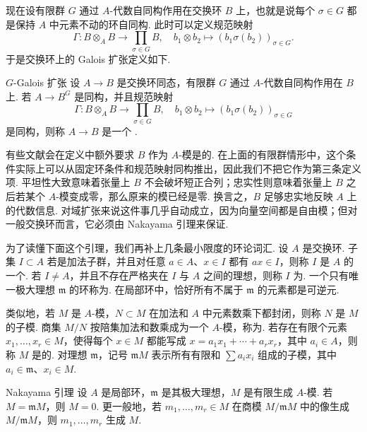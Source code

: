 现在设有限群 $G$ 通过 $A$-代数自同构作用在交换环 $B$ 上，也就是说每个 $\sigma\in G$ 都是保持 $A$ 中元素不动的环自同构. 此时可以定义规范映射
\[
    \Gamma\colon B\otimes_A B\to \prod_{\sigma\in G}B,\quad
    b_1\otimes b_2\mapsto \left(b_1\sigma(b_2)\right)_{\sigma\in G}.
\]
于是交换环上的 Galois 扩张定义如下.

\begin{definition}{$G$-Galois 扩张}{}
    设 $A\to B$ 是交换环同态，有限群 $G$ 通过 $A$-代数自同构作用在 $B$ 上. 若 $A\to B^G$ 是同构，并且规范映射
    \[
        \Gamma\colon B\otimes_A B\to \prod_{\sigma\in G}B,\quad
        b_1\otimes b_2\mapsto \left(b_1\sigma(b_2)\right)_{\sigma\in G}
    \]
    是同构，则称 $A\to B$ 是一个 .
\end{definition}

有些文献会在定义中额外要求 $B$ 作为 $A$-模是的. 在上面的有限群情形中，这个条件实际上可以从固定环条件和规范映射同构推出，因此我们不把它作为第三条定义项. 平坦性大致意味着张量上 $B$ 不会破坏短正合列；忠实性则意味着张量上 $B$ 之后若某个 $A$-模变成零，那么原来的模已经是零. 换言之，$B$ 足够忠实地反映 $A$ 上的代数信息. 对域扩张来说这件事几乎自动成立，因为向量空间都是自由模；但对一般交换环而言，它必须由 Nakayama 引理来保证.

为了读懂下面这个引理，我们再补上几条最小限度的环论词汇. 设 $A$ 是交换环. 子集 $I\subset A$ 若是加法子群，并且对任意 $a\in A$、$x\in I$ 都有 $ax\in I$，则称 $I$ 是 $A$ 的一个. 若 $I\neq A$，并且不存在严格夹在 $I$ 与 $A$ 之间的理想，则称 $I$ 为. 一个只有唯一极大理想 $\mathfrak{m}$ 的环称为. 在局部环中，恰好所有不属于 $\mathfrak{m}$ 的元素都是可逆元.

类似地，若 $M$ 是 $A$-模，$N\subset M$ 在加法和 $A$ 中元素数乘下都封闭，则称 $N$ 是 $M$ 的子模. 商集 $M/N$ 按陪集加法和数乘成为一个 $A$-模，称为. 若存在有限个元素 $x_1,\ldots,x_r\in M$，使得每个 $x\in M$ 都能写成 $x=a_1x_1+\cdots+a_rx_r$，其中 $a_i\in A$，则称 $M$ 是的. 对理想 $\mathfrak{m}$，记号 $\mathfrak{m}M$ 表示所有有限和 $\sum a_i x_i$ 组成的子模，其中 $a_i\in\mathfrak{m}$、$x_i\in M$.

\begin{lemma}{Nakayama 引理}{}
    设 $A$ 是局部环，$\mathfrak{m}$ 是其极大理想，$M$ 是有限生成 $A$-模. 若 $M=\mathfrak{m}M$，则 $M=0$. 更一般地，若 $m_1,\ldots,m_r\in M$ 在商模 $M/\mathfrak{m}M$ 中的像生成 $M/\mathfrak{m}M$，则 $m_1,\ldots,m_r$ 生成 $M$.
\end{lemma}

